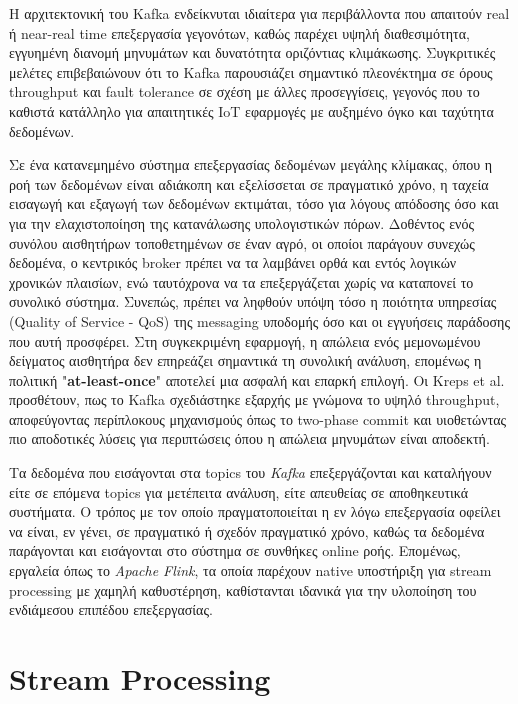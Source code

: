 Η αρχιτεκτονική του Kafka ενδείκνυται ιδιαίτερα
για περιβάλλοντα που απαιτούν real ή near-real time επεξεργασία γεγονότων,
καθώς παρέχει υψηλή διαθεσιμότητα, εγγυημένη διανομή μηνυμάτων και δυνατότητα
οριζόντιας κλιμάκωσης. Συγκριτικές μελέτες \cite{rtkafka} επιβεβαιώνουν ότι το
Kafka παρουσιάζει σημαντικό πλεονέκτημα σε όρους throughput και fault tolerance
σε σχέση με άλλες προσεγγίσεις, γεγονός που το καθιστά κατάλληλο για
απαιτητικές IoT εφαρμογές με αυξημένο όγκο και ταχύτητα δεδομένων.

Σε ένα κατανεμημένο σύστημα επεξεργασίας δεδομένων μεγάλης κλίμακας, όπου η ροή
των δεδομένων είναι αδιάκοπη και εξελίσσεται σε πραγματικό χρόνο, η ταχεία
εισαγωγή και εξαγωγή των δεδομένων εκτιμάται, τόσο για λόγους απόδοσης όσο και
για την ελαχιστοποίηση της κατανάλωσης υπολογιστικών πόρων. Δοθέντος ενός
συνόλου αισθητήρων τοποθετημένων σε έναν αγρό, οι οποίοι παράγουν συνεχώς
δεδομένα, ο κεντρικός broker πρέπει να τα λαμβάνει ορθά και εντός λογικών
χρονικών πλαισίων, ενώ ταυτόχρονα να τα επεξεργάζεται χωρίς να καταπονεί το
συνολικό σύστημα. Συνεπώς, πρέπει να ληφθούν υπόψη τόσο η ποιότητα υπηρεσίας
(Quality of Service - QoS) της messaging υποδομής όσο και οι εγγυήσεις
παράδοσης που αυτή προσφέρει. Στη συγκεκριμένη εφαρμογή, η απώλεια ενός
μεμονωμένου δείγματος αισθητήρα δεν επηρεάζει σημαντικά τη συνολική ανάλυση,
επομένως η πολιτική "\textbf{at-least-once}" αποτελεί μια ασφαλή και επαρκή
επιλογή. Οι Kreps et al. \cite{kafkaoriginal} προσθέτουν, πως το Kafka
σχεδιάστηκε εξαρχής με γνώμονα το υψηλό throughput, αποφεύγοντας περίπλοκους
μηχανισμούς όπως το two-phase commit και υιοθετώντας πιο αποδοτικές λύσεις για
περιπτώσεις όπου η απώλεια μηνυμάτων είναι αποδεκτή.

Τα δεδομένα που εισάγονται στα topics του \textit{Kafka} επεξεργάζονται και
καταλήγουν είτε σε επόμενα topics για μετέπειτα ανάλυση, είτε απευθείας σε
αποθηκευτικά συστήματα. Ο τρόπος με τον οποίο πραγματοποιείται η εν λόγω
επεξεργασία οφείλει να είναι, εν γένει, σε πραγματικό ή σχεδόν πραγματικό
χρόνο, καθώς τα δεδομένα παράγονται και εισάγονται στο σύστημα σε συνθήκες
online ροής. Επομένως, εργαλεία όπως το \textit{Apache Flink}, τα οποία
παρέχουν native υποστήριξη για stream processing με χαμηλή καθυστέρηση,
καθίστανται ιδανικά για την υλοποίηση του ενδιάμεσου επιπέδου επεξεργασίας.

\section{Stream Processing}

